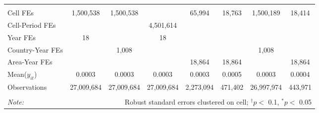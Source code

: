 \begin{table}[ht!]
\begin{tabular}{@{\extracolsep{0pt}}lccccccc}
\hline \\[-1.8ex] Cell FEs & 1,500,538 & 1,500,538 &  & 65,994 & 18,763 & 1,500,189 & 18,414 \\
Cell-Period FEs &  &  & 4,501,614 &  &  &  &  \\
Year FEs & 18 &  & 18 &  &  &  &  \\
Country-Year FEs &  & 1,008 &  &  &  & 1,008 &  \\
Area-Year FEs &  &  &  & 18,864 & 18,864 &  & 18,864 \\
Mean($y_{it}$) & 0.0003 & 0.0003 & 0.0003 & 0.0003 & 0.0005 & 0.0003 & 0.0004 \\
Observations & 27,009,684 & 27,009,684 & 27,009,684 & 2,273,094 & 471,402 & 26,997,974 & 443,971 \\
\hline
\hline \\[-1.8ex]
\textit{Note:}  & \multicolumn{7}{r}{Robust standard errors clustered on cell; $^{\dagger} p <$ 0.1, $^*p <$ 0.05} \\
\end{tabular}
\end{table}
